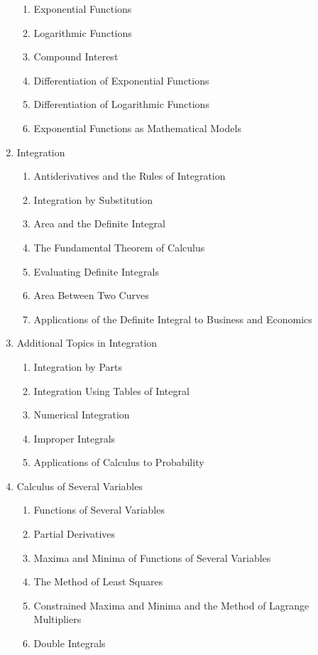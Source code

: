 \documentclass{amsart}
\begin{document}
\begin{enumerate}
	\begin{enumerate}
	\item Exponential Functions
	\item Logarithmic Functions
	\item Compound Interest
	\item Differentiation of Exponential Functions
	\item Differentiation of Logarithmic Functions
	\item Exponential Functions as Mathematical Models
	\end{enumerate}
\item Integration
 	\begin{enumerate}
	\item Antiderivatives and the Rules of Integration
	\item Integration by Substitution
	\item Area and the Definite Integral
	\item The Fundamental Theorem of Calculus
	\item Evaluating Definite Integrals
	\item Area Between Two Curves
	\item Applications of the Definite Integral to Business and Economics
	\end{enumerate}
\item Additional Topics in Integration
	\begin{enumerate}
	\item Integration by Parts
	\item Integration Using Tables of Integral
	\item Numerical Integration
	\item Improper Integrals
	\item Applications of Calculus to Probability
	\end{enumerate}
\item Calculus of Several Variables
	\begin{enumerate}
	\item Functions of Several Variables
	\item Partial Derivatives
	\item Maxima and Minima of Functions of Several Variables
	\item The Method of Least Squares
	\item Constrained Maxima and Minima and the Method of Lagrange Multipliers
	\item Double Integrals
	\end{enumerate}
\end{enumerate}
\end{document}
